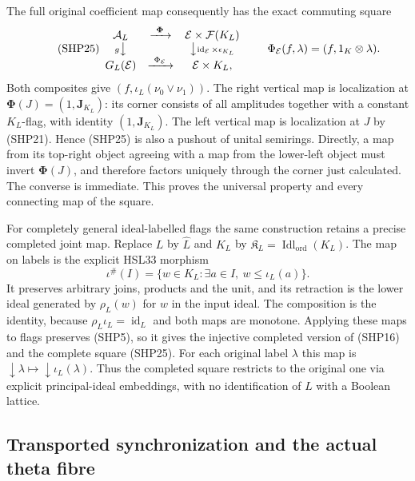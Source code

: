 The full original coefficient map consequently has
the exact commuting square
\begin{equation}\tag{SHP25}
 \begin{array}{ccc}
 \mathcal A_L&
    \xrightarrow{\ \boldsymbol\Phi\ }&
       \mathcal E\times\mathcal F(K_L)\\
 {\scriptstyle g}\big\downarrow
 &&\big\downarrow{\scriptstyle
                   \operatorname{id}_{\mathcal E}\times\epsilon_{K_L}}\\
 G_L(\mathcal E)&
    \xrightarrow{\ \Phi_{\mathcal E}\ }&
       \mathcal E\times K_L,
 \end{array}
 \qquad
 \Phi_{\mathcal E}(f,\lambda)=(f,1_K\otimes\lambda).
\end{equation}
Both composites give
$(f,\iota_L(\nu_0\vee\nu_1))$.
The right vertical map is localization at
$\boldsymbol\Phi(J)=(1,\mathbf J_{K_L})$:
its corner consists of all amplitudes together with
a constant $K_L$-flag, with identity
$(1,\mathbf J_{K_L})$.
The left vertical map is localization at $J$ by
(SHP21). Hence (SHP25) is also a pushout of
unital semirings. Directly, a map from its top-right
object agreeing with a map from the lower-left
object must invert $\boldsymbol\Phi(J)$, and
therefore factors uniquely through the corner
just calculated. The converse is immediate.
This proves the universal property and every
connecting map of the square.

For completely general ideal-labelled flags the same
construction retains a precise completed joint map.
Replace $L$ by $\widehat L$ and $K_L$ by
$\mathfrak K_L=\operatorname{Idl}_{\mathrm{ord}}(K_L)$.
The map on labels is the explicit HSL33 morphism
\[
 \iota^\#(I)=\{w\in K_L:
                   \exists a\in I,\ w\le\iota_L(a)\}.
\]
It preserves arbitrary joins, products and the unit,
and its retraction is the lower ideal generated by
$\rho_L(w)$ for $w$ in the input ideal.
The composition is the identity, because
$\rho_L\iota_L=\operatorname{id}_L$ and both maps
are monotone. Applying these maps to flags preserves
(SHP5), so it gives the injective completed version
of (SHP16) and the complete square (SHP25).
For each original label $\lambda$ this map is
$\downarrow\lambda\mapsto\downarrow\iota_L(\lambda)$.
Thus the completed square restricts to the original
one via explicit principal-ideal embeddings, with
no identification of $L$ with a Boolean lattice.

\subsection{Transported synchronization and the actual theta fibre}

